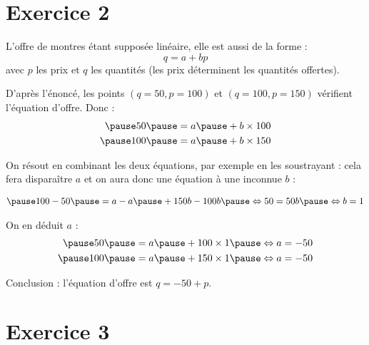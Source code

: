 \documentclass[9pt,professionalfonts,handout,hyperref]{beamer}
\begin{document}
  \section{Exercice 2}

  \begin{frame}

	L'offre de montres étant supposée linéaire, elle est aussi de la forme : $$q = a + bp $$ avec $p$ les prix et $q$ les quantités (les prix déterminent les quantités offertes).\newline

	\pause D'après l'énoncé, les points $(q=50,p=100)$ et $(q=100,p=150)$ vérifient l'équation d'offre. \pause Donc :
	\[
	\begin{aligned}
\pause 	50 \pause &= a \pause + b\times 100 \\
\pause 	100 \pause &= a \pause + b\times 150
	\end{aligned}
	\]

\pause 	On résout en combinant les deux équations, par exemple en les soustrayant : cela fera disparaître $a$ et on aura donc une équation à une inconnue $b$ :

	\[
	\begin{aligned}
\pause 	&100-50 \pause = a-a \pause + 150b -100b
\pause 	\Leftrightarrow50 = 50b 	\pause \Leftrightarrow b = 1 \\
	\end{aligned}
	\]

\pause 	On en déduit $a$ :
	\[
	\begin{aligned}
\pause 	50 \pause &= a \pause + 100\times 1 \pause \Leftrightarrow  a = -50\\
\pause 	100 \pause &= a \pause + 150 \times 1 \pause \Leftrightarrow  a = -50
	\end{aligned}
	\]

\medskip
\pause Conclusion : l'équation d'offre est $q = -50 +p $.

\end{frame}

\section{Exercice 3}
\end{document}
